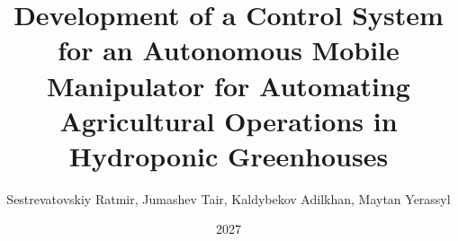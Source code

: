 \documentclass{trentthesis}
\title{Development of a Control System for an Autonomous Mobile Manipulator for Automating Agricultural Operations in Hydroponic Greenhouses}
\author{Sestrevatovskiy Ratmir, Jumashev Tair, Kaldybekov Adilkhan, Maytan Yerassyl}
\date{2027}
\begin{document}
\kbtubegin
\kbtutitlepage
% 
% 
% 

% 
\kbtucontents

\kbtuend
\doublespacing


% 
% 
% 
% 

\bibliographyheading


\end{document}

